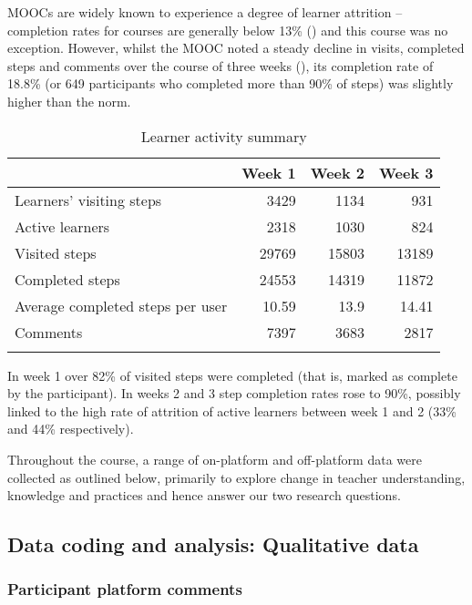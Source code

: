 \documentclass[output=paper]{langscibook}
\begin{document}
MOOCs are widely known to experience a degree of learner attrition -- completion rates for courses are generally below 13\% (\citealt{OnahEtAl2014}) and this course was no exception. However, whilst the MOOC noted a steady decline in visits, completed steps and comments over the course of three weeks (), its completion rate of 18.8\% (or 649 participants who completed more than 90\% of steps) was slightly higher than the norm.


\begin{table}
\begin{tabular}{l *3{r}}
\lsptoprule
& {Week 1} & {Week 2} & {Week 3}\\
\midrule
Learners’ visiting steps & 3429 & 1134 & 931\\
Active learners & 2318 & 1030 & 824\\
Visited steps & 29769 & 15803 & 13189\\
Completed steps & 24553 & 14319 & 11872\\
Average completed steps per user & 10.59 & 13.9 & 14.41\\
Comments & 7397 & 3683 & 2817\\
\lspbottomrule
\end{tabular}
\caption{Learner activity summary\label{tab:porter:5}}
\end{table}

In week 1 over 82\% of visited steps were completed (that is, marked as complete by the participant). In weeks 2 and 3 step completion rates rose to 90\%, possibly linked to the high rate of attrition of active learners between week 1 and 2 (33\% and 44\% respectively).\largerpage

Throughout the course, a range of on-platform and off-platform data were collected as outlined below, primarily to explore change in teacher understanding, knowledge and practices and hence answer our two research questions.

\subsection{Data coding and analysis: Qualitative data}\label{sec:porter:2.3}
\subsubsection{Participant platform comments}\label{sec:porter:2.3.1}
\end{document}
